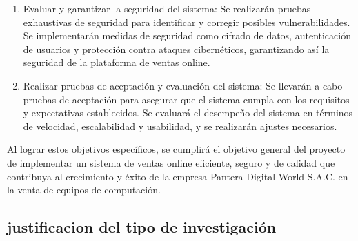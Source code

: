 \documentclass[12pt,a4paper]{article}
\newcommand{\newsubsection}[1]{\subsection{\hspace{4mm} #1}}
\newcommand{\empresa}{Pantera Digital World S.A.C. }
\begin{document}
\begin{enumerate}
\item Evaluar y garantizar la seguridad del sistema: Se realizarán pruebas exhaustivas de seguridad para identificar y corregir posibles vulnerabilidades. Se implementarán medidas de seguridad como cifrado de datos, autenticación de usuarios y protección contra ataques cibernéticos, garantizando así la seguridad de la plataforma de ventas online.
\item Realizar pruebas de aceptación y evaluación del sistema: Se llevarán a cabo pruebas de aceptación para asegurar que el sistema cumpla con los requisitos y expectativas establecidos. Se evaluará el desempeño del sistema en términos de velocidad, escalabilidad y usabilidad, y se realizarán ajustes necesarios.
\end{enumerate}
Al lograr estos objetivos específicos, se cumplirá el objetivo general del proyecto de implementar un sistema de ventas online eficiente, seguro y de calidad que contribuya al crecimiento y éxito de la empresa \empresa en la venta de equipos de computación. %
\newsubsection{justificacion del tipo de investigación}
\end{document}
